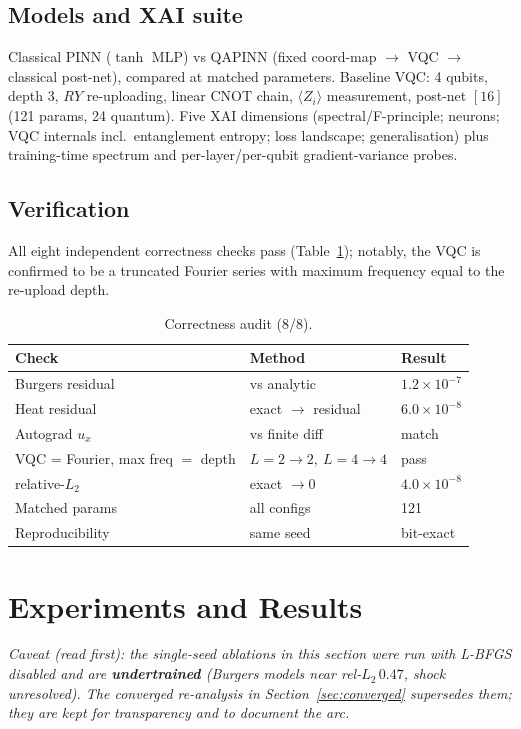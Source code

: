 \documentclass[11pt]{article}
\begin{document}
\subsection{Models and XAI suite}
Classical PINN ($\tanh$ MLP) vs QAPINN (fixed coord-map $\to$ VQC $\to$ classical
post-net), compared at matched parameters. Baseline VQC: 4 qubits, depth 3, $RY$
re-uploading, linear CNOT chain, $\langle Z_i\rangle$ measurement, post-net $[16]$
(121 params, 24 quantum). Five XAI dimensions (spectral/F-principle; neurons;
VQC internals incl.\ entanglement entropy; loss landscape; generalisation) plus
training-time spectrum and per-layer/per-qubit gradient-variance probes.

\subsection{Verification}
All eight independent correctness checks pass (Table~\ref{tab:verify}); notably,
the VQC is confirmed to be a truncated Fourier series with maximum frequency equal
to the re-upload depth.

\begin{table}[t]
  \centering \small
  \begin{tabular}{lll}
    \toprule
    Check & Method & Result \\ \midrule
    Burgers residual & vs analytic & $1.2\times10^{-7}$ \\
    Heat residual & exact $\to$ residual & $6.0\times10^{-8}$ \\
    Autograd $u_x$ & vs finite diff & match \\
    VQC = Fourier, max freq $=$ depth & $L{=}2\!\to\!2,\ L{=}4\!\to\!4$ & pass \\
    relative-$L_2$ & exact $\to 0$ & $4.0\times10^{-8}$ \\
    Matched params & all configs & 121 \\
    Reproducibility & same seed & bit-exact \\ \bottomrule
  \end{tabular}
  \caption{Correctness audit (8/8).}
  \label{tab:verify}
\end{table}

\section{Experiments and Results}
\emph{Caveat (read first): the single-seed ablations in this section were run with
L-BFGS disabled and are \textbf{undertrained} (Burgers models near rel-$L_2\,0.47$,
shock unresolved). The converged re-analysis in Section~\ref{sec:converged}
supersedes them; they are kept for transparency and to document the arc.}
\end{document}
